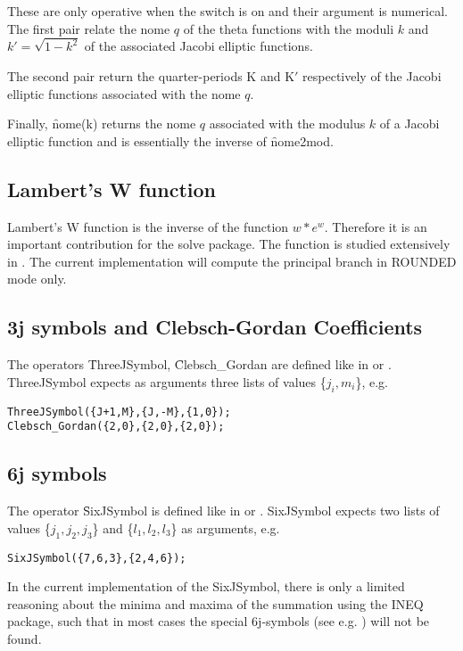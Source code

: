 These are only operative when the switch  is on and their
argument is numerical. The first pair relate the nome $q$ of the theta
functions with the moduli $k$ and $k'=\sqrt{1-k^2}$ of the associated Jacobi
elliptic functions.

The second pair return the quarter-periods K and K$'$ respectively of
the Jacobi elliptic functions associated with the nome $q$.

Finally, \f{nome(k)} returns the nome $q$ associated with the modulus $k$ of
a Jacobi elliptic function and is essentially the inverse of \f{nome2mod}.

\subsection{Lambert's W function}

Lambert's W function is the inverse of the function  $w*e^w$.
Therefore it is an important contribution for the solve package.
The function is studied extensively in \cite{HareCorless:92}.  
The current implementation will compute the principal branch in
ROUNDED mode only.

\subsection{3j symbols and Clebsch-Gordan Coefficients}
The operators \f{ThreeJSymbol}, \f{Clebsch\_Gordan} are defined like 
in \cite{LandoltBoernstein:68} or \cite{Edmonds:57}. ThreeJSymbol expects as arguments
three lists of values \{$j_i,m_i$\}, e.g.

\begin{verbatim}
ThreeJSymbol({J+1,M},{J,-M},{1,0});
Clebsch_Gordan({2,0},{2,0},{2,0});
\end{verbatim}

\subsection{6j symbols }
The operator \f{SixJSymbol} is defined like
in \cite{LandoltBoernstein:68} or \cite{Edmonds:57}.
SixJSymbol expects two lists of values \{$j_1,j_2,j_3$\} and
 \{$l_1,l_2,l_3$\} as arguments, e.g.

\begin{verbatim}
SixJSymbol({7,6,3},{2,4,6});
\end{verbatim}

In the current implementation of the SixJSymbol, there is only a limited
reasoning about the minima and maxima of the summation using
the INEQ package, such that in most
cases the special 6j-symbols (see e.g. \cite{LandoltBoernstein:68})
will not be found.



